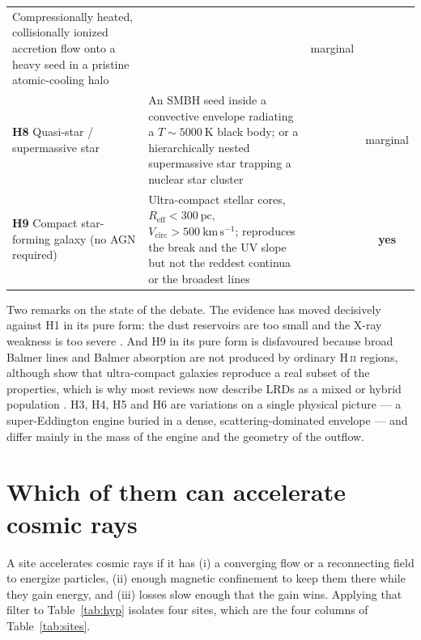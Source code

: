 \documentclass[11pt,a4paper]{article}
\begin{document}
\begin{table}[t]
\begin{tabular}{@{}p{}p{}cc@{}}
Compressionally heated, collisionally ionized accretion flow onto a heavy seed
in a pristine atomic-cooling halo &
\citealt{Pacucci2026} & marginal \\
\addlinespace
\textbf{H8} Quasi-star / supermassive star &
An SMBH seed inside a convective envelope radiating a $T\sim5000\ \mathrm{K}$
black body; or a hierarchically nested supermassive star trapping a nuclear
star cluster &
\citealt{Gentile2026,AmaroSeoane2026,Shi2026} & marginal \\
\addlinespace
\textbf{H9} Compact star-forming galaxy (no AGN required) &
Ultra-compact stellar cores, $R_{\mathrm{eff}}<300\ \mathrm{pc}$,
$V_{\mathrm{circ}}>500\ \mathrm{km\,s^{-1}}$; reproduces the break and the UV
slope but not the reddest continua or the broadest lines &
\citealt{Roy2026,Vaida2026} & \textbf{yes} \\
\bottomrule
\end{tabular}
\end{table}

Two remarks on the state of the debate. The evidence has moved decisively
against H1 in its pure form: the dust reservoirs are too small
\citep{Rusakov2026,Naidu2025} and the X-ray weakness is too severe
\citep{Sacchi2025,Tortosa2026}. And H9 in its pure form is disfavoured because
broad Balmer lines and Balmer absorption are not produced by ordinary
H\,\textsc{ii} regions, although \citet{Roy2026} show that ultra-compact
galaxies reproduce a real subset of the properties, which is why most reviews
now describe LRDs as a mixed or hybrid population \citep{Vaida2026}.
H3, H4, H5 and H6 are variations on a single physical picture --- a
super-Eddington engine buried in a dense, scattering-dominated envelope --- and
differ mainly in the mass of the engine and the geometry of the outflow.

\section{Which of them can accelerate cosmic rays}
\label{sec:which}
A site accelerates cosmic rays if it has (i) a converging flow or a
reconnecting field to energize particles, (ii) enough magnetic confinement to
keep them there while they gain energy, and (iii) losses slow enough that the
gain wins. Applying that filter to Table~\ref{tab:hyp} isolates four sites,
which are the four columns of Table~\ref{tab:sites}.
\end{document}
